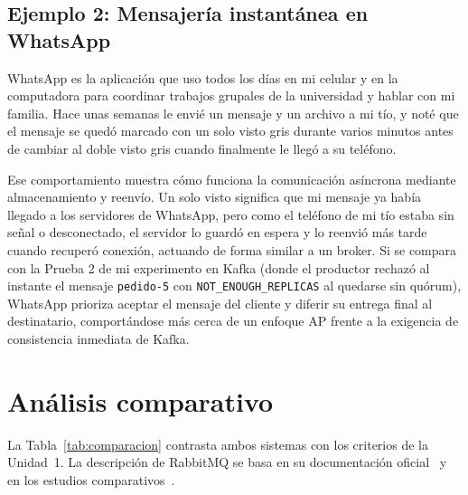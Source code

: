 \documentclass[12pt,a4paper]{article}
\begin{document}
\subsection{Ejemplo 2: Mensajería instantánea en WhatsApp}
WhatsApp es la aplicación que uso todos los días en mi celular y en la computadora para coordinar trabajos grupales de la universidad y hablar con mi familia. Hace unas semanas le envié un mensaje y un archivo a mi tío, y noté que el mensaje se quedó marcado con un solo visto gris durante varios minutos antes de cambiar al doble visto gris cuando finalmente le llegó a su teléfono.

Ese comportamiento muestra cómo funciona la comunicación asíncrona mediante almacenamiento y reenvío. Un solo visto significa que mi mensaje ya había llegado a los servidores de WhatsApp, pero como el teléfono de mi tío estaba sin señal o desconectado, el servidor lo guardó en espera y lo reenvió más tarde cuando recuperó conexión, actuando de forma similar a un broker. Si se compara con la Prueba 2 de mi experimento en Kafka (donde el productor rechazó al instante el mensaje \texttt{pedido-5} con \texttt{NOT\_ENOUGH\_REPLICAS} al quedarse sin quórum), WhatsApp prioriza aceptar el mensaje del cliente y diferir su entrega final al destinatario, comportándose más cerca de un enfoque AP frente a la exigencia de consistencia inmediata de Kafka.

\section{Análisis comparativo}\label{sec:comparativo}

La Tabla~\ref{tab:comparacion} contrasta ambos sistemas con los criterios de la Unidad~1. La descripción de RabbitMQ se basa en su documentación oficial~\cite{RabbitMQQuorum,RabbitMQ2021Deprecation} y en los estudios comparativos~\cite{Kaczor2022,Maharjan2023,Kaminski2025,Ramadan2026}.
\end{document}
